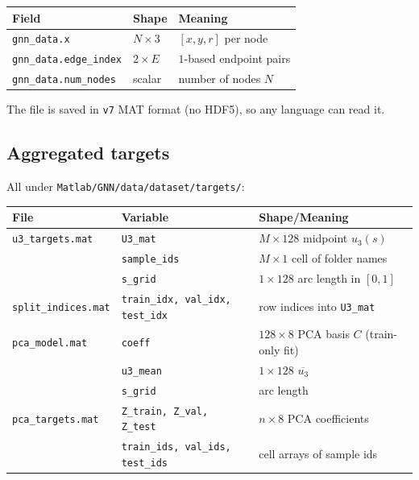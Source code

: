 \documentclass[11pt]{article}
\begin{document}
\begin{center}
\begin{tabular}{lll}
\toprule
Field & Shape & Meaning \\
\midrule
\texttt{gnn\_data.x}          & $N\times 3$   & $[x,y,r]$ per node \\
\texttt{gnn\_data.edge\_index}& $2\times E$   & $1$-based endpoint pairs \\
\texttt{gnn\_data.num\_nodes} & scalar        & number of nodes $N$ \\
\bottomrule
\end{tabular}
\end{center}

The file is saved in \texttt{v7} MAT format (no HDF5), so any language can
read it.

\subsection{Aggregated targets}

All under \texttt{Matlab/GNN/data/dataset/targets/}:

\begin{center}
\begin{tabular}{lll}
\toprule
File & Variable & Shape/Meaning \\
\midrule
\texttt{u3\_targets.mat}
  & \texttt{U3\_mat}    & $M\times 128$ midpoint $u_3(s)$ \\
  & \texttt{sample\_ids}& $M\times 1$ cell of folder names \\
  & \texttt{s\_grid}    & $1\times 128$ arc length in $[0,1]$ \\
\midrule
\texttt{split\_indices.mat}
  & \texttt{train\_idx, val\_idx, test\_idx} & row indices into \texttt{U3\_mat} \\
\midrule
\texttt{pca\_model.mat}
  & \texttt{coeff}      & $128\times 8$ PCA basis $C$ (train-only fit) \\
  & \texttt{u3\_mean}   & $1\times 128$ $\overline{u_3}$ \\
  & \texttt{s\_grid}    & arc length \\
\midrule
\texttt{pca\_targets.mat}
  & \texttt{Z\_train, Z\_val, Z\_test} & $n\times 8$ PCA coefficients \\
  & \texttt{train\_ids, val\_ids, test\_ids} & cell arrays of sample ids \\
\bottomrule
\end{tabular}
\end{center}
\end{document}
